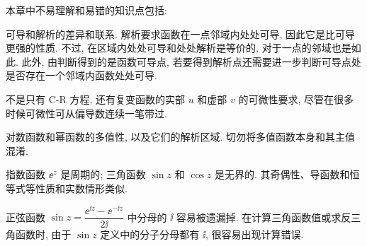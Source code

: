 本章中不易理解和易错的知识点包括:
\begin{enuma}
  \item 可导和解析的差异和联系. 解析要求函数在一点邻域内处处可导, 因此它是比可导更强的性质.
  不过, 在区域内处处可导和处处解析是等价的, 对于一点的邻域也是如此.
  此外, 由\thmCR 判断得到的是函数可导点, 若要得到解析点还需要进一步判断可导点处是否存在一个邻域内函数处处可导.
  \item \thmCR 不是只有 C-R 方程, 还有复变函数的实部 $u$ 和虚部 $v$ 的可微性要求, 尽管在很多时候可微性可从偏导数连续一笔带过.
  \item 对数函数和幂函数的多值性, 以及它们的解析区域. 切勿将多值函数本身和其主值混淆.
  \item 指数函数 $\ee^z$ 是周期的; 三角函数 $\sin z$ 和 $\cos z$ 是无界的. 其奇偶性、导函数和恒等式等性质和实数情形类似.
  \item 正弦函数 $\sin z=\dfrac{\ee^{\ii z}-\ee^{-\ii z}}{2\ii}$ 中分母的 $\ii$ 容易被遗漏掉.
  在计算三角函数值或求反三角函数时, 由于 $\sin z$ 定义中的分子分母都有 $\ii$, 很容易出现计算错误.
\end{enuma}


